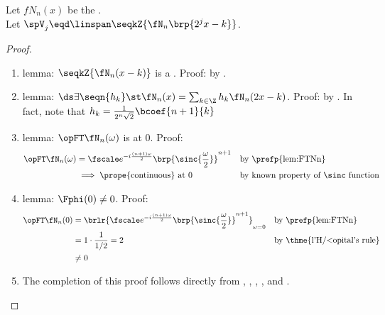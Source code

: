\begin{theorem}
\label{thm:Nmra}
Let $fN_n(x)$ be the  .\\
Let $\spV_j\eqd\linspan\seqkZ{\fN_n\brp{2^jx-k}}$.
\end{theorem}
\begin{proof}
\begin{enumerate}
  \item lemma: $\seqkZ{\fN_n(x-k)}$ is a . \label{ilem:Nmra_riesz}
        Proof: by .

  \item lemma: $\ds\exists \seqn{h_k} \st \fN_n(x)=\sum_{k\in\Z}h_k\fN_n(2x-k)$. \label{ilem:Nmra_2x}
        Proof: by .
        In fact, note that $h_k = \frac{1}{2^n\sqrt{2}}\bcoef{n+1}{k}$

  \item lemma: $\opFT\fN_n(\omega)$ is  at $0$. \label{ilem:Nmra_continuous} Proof:
    \begin{align*}
      \opFT\fN_n(\omega)
        &= \fscale e^{-i\frac{(n+1)\omega}{2}} \brp{\sinc{\frac{\omega}{2}}}^{n+1}
        && \text{by \prefp{lem:FTNn}}
      \\&\implies\text{\prope{continuous} at $0$}
        && \text{by known property of $\sinc$ function}
    \end{align*}

  \item lemma: $\Fphi(0)\neq0$. \label{ilem:Nmra_neq0} Proof:
    \begin{align*}
      \opFT\fN_n(0)
        &= \brlr{\fscale e^{-i\frac{(n+1)\omega}{2}} \brp{\sinc{\frac{\omega}{2}}}^{n+1}}_{\omega=0}
        && \text{by \prefp{lem:FTNn}}
      \\&= 1\cdot\frac{1}{1/2} = 2
        && \text{by \thme{l'H{/<o}pital's rule}}
      \\&\neq 0
    \end{align*}

  \item The completion of this proof follows directly from
        , , , , and
        .
\end{enumerate}
\end{proof}

